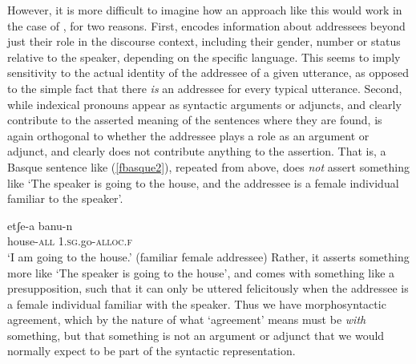 \documentclass[output=paper, modfonts, nonflat]{langsci/langscibook}
\begin{document}
However, it is more difficult to imagine how an approach like this
would work in the case of \allagr, for two reasons. First, \allagr{}
encodes information about addressees beyond just their role in the
discourse context, including their gender, number or status relative
to the speaker, depending on the specific language. This seems to
imply sensitivity to the actual identity of the addressee of a given
utterance, as opposed to the simple fact that there \emph{is} an
addressee for every typical utterance. Second, while indexical
pronouns appear as syntactic arguments or adjuncts, and clearly
contribute to the asserted meaning of the sentences where they are
found, \allagr{} is again orthogonal to whether the addressee plays a
role as an argument or adjunct, and clearly does not contribute
anything to the assertion. That is, a Basque sentence like
(\ref{fbasque2}), repeated from above, does \emph{not} assert
something like `The speaker is going to the house, and the addressee
is a female individual familiar to the speaker'.

\ea\label{fbasque2}\gll etʃe-a banu-n\\
  house-\textsc{all}{} 1.\textsc{sg}.go-\textsc{alloc}.\textsc{f}\\
  \glt `I am going to the house.' (familiar female addressee)
\z
%
Rather, it asserts something more like `The speaker is going to the
house', and comes with something like a presupposition, such that it
can only be uttered felicitously when the addressee is a female
individual familiar with the speaker. Thus we have morphosyntactic
agreement, which by the nature of what `agreement' means must be
\emph{with} something, but that something is not an argument or
adjunct that we would normally expect to be part of the syntactic
representation.
\end{document}
